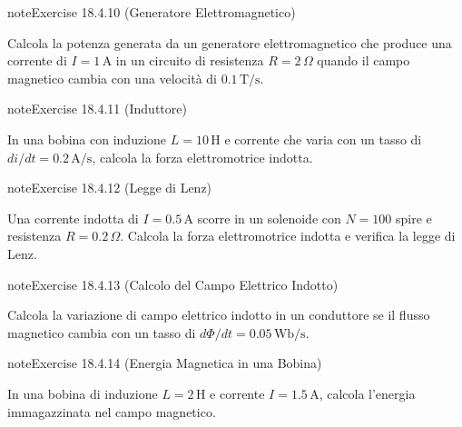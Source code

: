 \documentclass[letterpaper,10pt,italian]{jupyterBook}
\begin{document}
\begin{sphinxadmonition}{note}{Exercise 18.4.10 (Generatore Elettromagnetico)}



\sphinxAtStartPar
Calcola la potenza generata da un generatore elettromagnetico che produce una corrente di \(I = 1 \, \text{A}\) in un circuito di resistenza \(R = 2 \, \Omega\) quando il campo magnetico cambia con una velocità di \(0.1 \, \text{T/s}\).
\end{sphinxadmonition}
 \label{exercise:ch/electromagnetism/electromagnetism-general-problems-exercise-10}

\begin{sphinxadmonition}{note}{Exercise 18.4.11 (Induttore)}



\sphinxAtStartPar
In una bobina con induzione \(L = 10 \, \text{H}\) e corrente che varia con un tasso di \(di/dt = 0.2 \, \text{A/s}\), calcola la forza elettromotrice indotta.
\end{sphinxadmonition}
 \label{exercise:ch/electromagnetism/electromagnetism-general-problems-exercise-11}

\begin{sphinxadmonition}{note}{Exercise 18.4.12 (Legge di Lenz)}



\sphinxAtStartPar
Una corrente indotta di \(I = 0.5 \, \text{A}\) scorre in un solenoide con \(N = 100\) spire e resistenza \(R = 0.2 \, \Omega\). Calcola la forza elettromotrice indotta e verifica la legge di Lenz.
\end{sphinxadmonition}
 \label{exercise:ch/electromagnetism/electromagnetism-general-problems-exercise-12}

\begin{sphinxadmonition}{note}{Exercise 18.4.13 (Calcolo del Campo Elettrico Indotto)}



\sphinxAtStartPar
Calcola la variazione di campo elettrico indotto in un conduttore se il flusso magnetico cambia con un tasso di \(d\Phi/dt = 0.05 \, \text{Wb/s}\).
\end{sphinxadmonition}
 \label{exercise:ch/electromagnetism/electromagnetism-general-problems-exercise-13}

\begin{sphinxadmonition}{note}{Exercise 18.4.14 (Energia Magnetica in una Bobina)}



\sphinxAtStartPar
In una bobina di induzione \(L = 2 \, \text{H}\) e corrente \(I = 1.5 \, \text{A}\), calcola l’energia immagazzinata nel campo magnetico.
\end{sphinxadmonition}
 \label{exercise:ch/electromagnetism/electromagnetism-general-problems-exercise-14}
\end{document}
